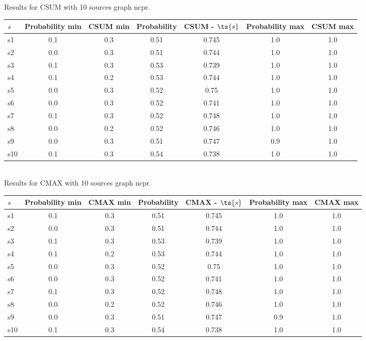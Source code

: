 \documentclass{article}
\begin{document}
\noindent Results for CSUM with 10 sources graph ncpr.

\noindent\begin{tabular}{|l|c|c|c|c|c|c|}
\hline
$s$& Probability min & CSUM min & Probability & CSUM - $\ts{s}$ & Probability max & CSUM max\\
\hline
s1 &0.1 & 0.3 & 0.51 & 0.745 & 1.0 & 1.0\\
\hline
s2 &0.0 & 0.3 & 0.51 & 0.744 & 1.0 & 1.0\\
\hline
s3 &0.1 & 0.3 & 0.53 & 0.739 & 1.0 & 1.0\\
\hline
s4 &0.1 & 0.2 & 0.53 & 0.744 & 1.0 & 1.0\\
\hline
s5 &0.0 & 0.3 & 0.52 & 0.75 & 1.0 & 1.0\\
\hline
s6 &0.0 & 0.3 & 0.52 & 0.741 & 1.0 & 1.0\\
\hline
s7 &0.1 & 0.3 & 0.52 & 0.748 & 1.0 & 1.0\\
\hline
s8 &0.0 & 0.2 & 0.52 & 0.746 & 1.0 & 1.0\\
\hline
s9 &0.0 & 0.3 & 0.51 & 0.747 & 0.9 & 1.0\\
\hline
s10 &0.1 & 0.3 & 0.54 & 0.738 & 1.0 & 1.0\\
\hline
\end{tabular}\\

\noindent Results for CMAX with 10 sources graph ncpr.

\noindent\begin{tabular}{|l|c|c|c|c|c|c|}
\hline
$s$& Probability min & CMAX min & Probability & CMAX - $\ts{s}$ & Probability max & CMAX max\\
\hline
s1 &0.1 & 0.3 & 0.51 & 0.745 & 1.0 & 1.0\\
\hline
s2 &0.0 & 0.3 & 0.51 & 0.744 & 1.0 & 1.0\\
\hline
s3 &0.1 & 0.3 & 0.53 & 0.739 & 1.0 & 1.0\\
\hline
s4 &0.1 & 0.2 & 0.53 & 0.744 & 1.0 & 1.0\\
\hline
s5 &0.0 & 0.3 & 0.52 & 0.75 & 1.0 & 1.0\\
\hline
s6 &0.0 & 0.3 & 0.52 & 0.741 & 1.0 & 1.0\\
\hline
s7 &0.1 & 0.3 & 0.52 & 0.748 & 1.0 & 1.0\\
\hline
s8 &0.0 & 0.2 & 0.52 & 0.746 & 1.0 & 1.0\\
\hline
s9 &0.0 & 0.3 & 0.51 & 0.747 & 0.9 & 1.0\\
\hline
s10 &0.1 & 0.3 & 0.54 & 0.738 & 1.0 & 1.0\\
\hline
\end{tabular}\\
\end{document}
